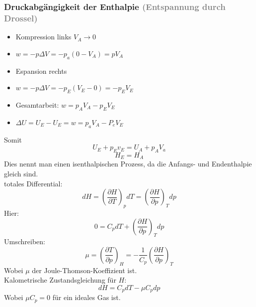 \documentclass[a4paper]{article}
\begin{document}
\subsubsection{Druckabgängigkeit der Enthalpie \textcolor{gray}{(Entspannung durch Drossel)}}
\begin{itemize}
    \item[] Kompression links $V_A \rightarrow 0$
    \item[] $w = -p\Delta V=-p_a(0-V_A)=pV_A$
    \item[] Espansion rechts
    \item[] $w = -p\Delta V = -p_E(V_E - 0) = -p_EV_E$
    \item[] Gesamtarbeit: $w = p_AV_A-p_EV_E$
    \item[] $\Delta U=U_E-U_E=w=p_aV_A - P_eV_E$
\end{itemize}
Somit
\begin{equation*}
    U_E + p_Ev_E = U_A + p_AV_a
\end{equation*}
\begin{equation*}
    H_E = H_A
\end{equation*}
Dies nennt man einen isenthalpischen Prozess, da die Anfangs- und Endenthalpie gleich sind.\\
totales Differential:
\begin{equation*}
    dH = \left(\frac{\partial H}{\partial T}\right)_p dT = \left(\frac{\partial H}{\partial p}\right)_T dp
\end{equation*}
Hier:
\begin{equation*}
    0 = C_p dT + \left(\frac{\partial H}{\partial p}\right)_T dp
\end{equation*}
Umschreiben:
\begin{equation*}
    \mu = \left(\frac{\partial T}{\partial p}\right)_H = - \frac{1}{C_p}\left(\frac{\partial H}{\partial p}\right)_T
\end{equation*}
Wobei $\mu$ der Joule-Thomson-Koeffizient ist.\\
Kalometrische Zustandsgleichung für $H$:
\begin{equation*}
    dH = C_p dT - \mu C_p dp
\end{equation*}
Wobei $\mu C_p = 0$ für ein ideales Gas ist.
\end{document}
